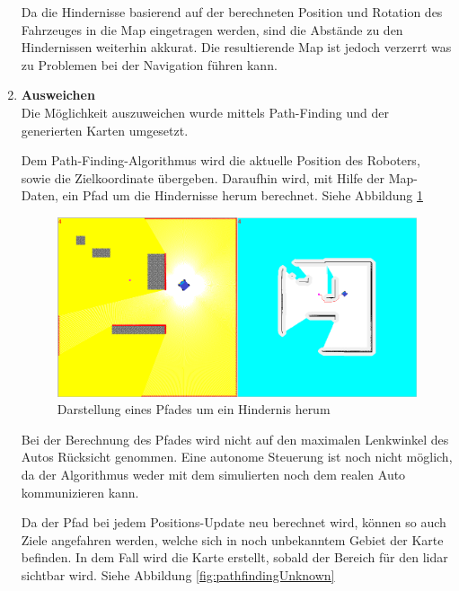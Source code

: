 \begin{enumerate}[leftmargin=*]
    Da die Hindernisse basierend auf der berechneten Position und Rotation des Fahrzeuges in die Map eingetragen werden,
    sind die Abstände zu den Hindernissen weiterhin akkurat.
    Die resultierende Map ist jedoch verzerrt was zu Problemen bei der Navigation führen kann.

    \item \textbf{Ausweichen} \\
    Die Möglichkeit auszuweichen wurde mittels Path-Finding und der generierten Karten umgesetzt.
    
    Dem Path-Finding-Algorithmus wird die aktuelle Position des Roboters, sowie die Zielkoordinate übergeben.
    Daraufhin wird, mit Hilfe der Map-Daten, ein Pfad um die Hindernisse herum berechnet.
    Siehe Abbildung \ref{fig:pathfinding}
    \begin{figure}[H]
        \centering
        \includegraphics[width=12cm]{graphics/pathfinding.png}
        \caption{Darstellung eines Pfades um ein Hindernis herum}
        \label{fig:pathfinding}
    \end{figure}

    Bei der Berechnung des Pfades wird nicht auf den maximalen Lenkwinkel des Autos Rücksicht genommen.
    Eine autonome Steuerung ist noch nicht möglich, da der Algorithmus weder mit dem simulierten noch dem realen Auto kommunizieren kann.

    Da der Pfad bei jedem Positions-Update neu berechnet wird, können so auch Ziele angefahren werden,
    welche sich in noch unbekanntem Gebiet der Karte befinden.
    In dem Fall wird die Karte erstellt, sobald der Bereich für den \ac{lidar} sichtbar wird.
    Siehe Abbildung \ref{fig:pathfindingUnknown}


\end{enumerate}
